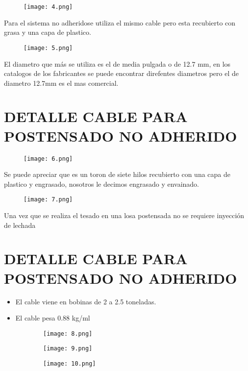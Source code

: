 \begin{figure}[H]
\centering
\texttt{[image: 4.png]}
\end{figure}

Para el \textquotedbl sistema no adherido\textquotedbl se utiliza el mismo cable pero esta recubierto
con grasa y una capa de plastico.

\begin{figure}[H]
\centering
\texttt{[image: 5.png]}
\end{figure}

El diametro que más se utiliza es el de media pulgada o de 12.7 mm, en los catalogos
de los fabricantes se puede encontrar direfentes diametros pero el de diametro 12.7mm
es el mas comercial.

\section{DETALLE CABLE PARA POSTENSADO NO ADHERIDO}

\begin{figure}[H]
\centering
\texttt{[image: 6.png]}
\end{figure}

Se puede apreciar que es un toron de siete hilos recubierto con una capa de plastico
y engrasado, nosotros le decimos engrasado y envainado.

\begin{figure}[H]
\centering
\texttt{[image: 7.png]}
\end{figure}

Una vez que se realiza el tesado en una losa postensada no se requiere inyección
de lechada

\section{DETALLE CABLE PARA POSTENSADO NO ADHERIDO}

\begin{itemize}
	\item El cable viene en bobinas de 2 a 2.5 toneladas.
	\item El cable pesa 0.88 kg/ml
\end{itemize}

\begin{figure}[H]
	\begin{subfigure}{0.3\textwidth}
		\centering
		\texttt{[image: 8.png]}
	\end{subfigure}
	\begin{subfigure}{0.3\textwidth}
		\centering
		\texttt{[image: 9.png]}
	\end{subfigure}
	\begin{subfigure}{0.3\textwidth}
		\centering
		\texttt{[image: 10.png]}
	\end{subfigure}
\end{figure}

